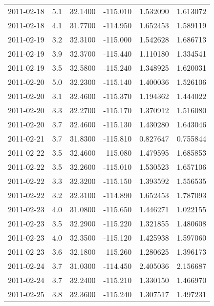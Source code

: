 \begin{tabular}{lrrrrr}
2011-02-18 &       5.1 &  32.1400 &  -115.010 &         1.532090 &         1.613072 \\
2011-02-18 &       4.1 &  31.7700 &  -114.950 &         1.652453 &         1.589119 \\
2011-02-19 &       3.2 &  32.3100 &  -115.000 &         1.542628 &         1.686713 \\
2011-02-19 &       3.9 &  32.3700 &  -115.440 &         1.110180 &         1.334541 \\
2011-02-19 &       3.5 &  32.5800 &  -115.240 &         1.348925 &         1.620031 \\
2011-02-20 &       5.0 &  32.2300 &  -115.140 &         1.400036 &         1.526106 \\
2011-02-20 &       3.1 &  32.4600 &  -115.370 &         1.194362 &         1.444022 \\
2011-02-20 &       3.3 &  32.2700 &  -115.170 &         1.370912 &         1.516080 \\
2011-02-20 &       3.7 &  32.4600 &  -115.130 &         1.430280 &         1.643046 \\
2011-02-21 &       3.7 &  31.8300 &  -115.810 &         0.827647 &         0.755844 \\
2011-02-22 &       3.5 &  32.4600 &  -115.080 &         1.479595 &         1.685853 \\
2011-02-22 &       3.5 &  32.2600 &  -115.010 &         1.530523 &         1.657106 \\
2011-02-22 &       3.3 &  32.3200 &  -115.150 &         1.393592 &         1.556535 \\
2011-02-22 &       3.2 &  32.3100 &  -114.890 &         1.652453 &         1.787093 \\
2011-02-23 &       4.0 &  31.0800 &  -115.650 &         1.446271 &         1.022155 \\
2011-02-23 &       3.5 &  32.2900 &  -115.220 &         1.321855 &         1.480608 \\
2011-02-23 &       4.0 &  32.3500 &  -115.120 &         1.425938 &         1.597060 \\
2011-02-23 &       3.6 &  32.1800 &  -115.260 &         1.280625 &         1.396173 \\
2011-02-24 &       3.7 &  31.0300 &  -114.450 &         2.405036 &         2.156687 \\
2011-02-24 &       3.7 &  32.2400 &  -115.210 &         1.330150 &         1.466970 \\
2011-02-25 &       3.8 &  32.3600 &  -115.240 &         1.307517 &         1.497231 \\

\end{tabular}
